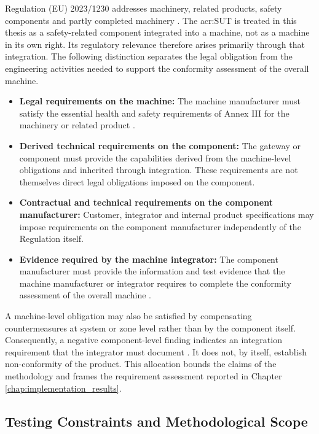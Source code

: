 Regulation (EU) 2023/1230 addresses machinery, related products, safety components and partly completed machinery \cite[pp. 11]{EU2023_1230}. The \gls{acr:SUT} is treated in this thesis as a safety-related component integrated into a machine, not as a machine in its own right. Its regulatory relevance therefore arises primarily through that integration. The following distinction separates the legal obligation from the engineering activities needed to support the conformity assessment of the overall machine. 
\begin{itemize} 
	\item \textbf{Legal requirements on the machine:} The machine manufacturer must satisfy the essential health and safety requirements of Annex III for the machinery or related product \cite[p. 44]{EU2023_1230}. 
	\item \textbf{Derived technical requirements on the component:} The gateway or component must provide the capabilities derived from the machine-level obligations and inherited through integration. These requirements are not themselves direct legal obligations imposed on the component. 
	\item \textbf{Contractual and technical requirements on the component manufacturer:} Customer, integrator and internal product specifications may impose requirements on the component manufacturer independently of the Regulation itself. 
	\item \textbf{Evidence required by the machine integrator:} The component manufacturer must provide the information and test evidence that the machine manufacturer or integrator requires to complete the conformity assessment of the overall machine \cite[p. 20, pp. 97]{EU2023_1230}. 
\end{itemize} 

A machine-level obligation may also be satisfied by compensating countermeasures at system or zone level rather than by the component itself. Consequently, a negative component-level finding indicates an integration requirement that the integrator must document \cite[p. 30]{IEC62443-4-2} \cite[pp. 27]{IEC62443-3-3}. It does not, by itself, establish non-conformity of the product. This allocation bounds the claims of the methodology and frames the requirement assessment reported in Chapter \ref{chap:implementation_results}. 

\subsection{Testing Constraints and Methodological Scope} 
\label{subsec:constraints_scope} 

